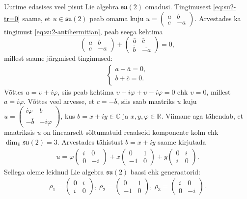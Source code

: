\documentclass[12pt]{article}
\theoremstyle{plain}
\theoremstyle{definition}
\numberwithin{equation}{section}
\def\R{{\mathbb R}}
\def\C{{\mathbb C}}
\def\su2{{\mathfrak{ su}\left(2\right)}}
\begin{document}
Uurime edasises veel pisut Lie algebra $\su2$ omadusi. Tingimusest 
\ref{eq:su2-tr=0} saame, et $u \in \su2$ peab omama kuju 
$u = \begin{pmatrix} a & b \\ c & -a\end{pmatrix}$. Arvestades ka 
tingimust \ref{eq:su2-antihermitian}, peab seega kehtima
\[\begin{pmatrix} a & b \\ c & -a\end{pmatrix} + \begin{pmatrix} 
\overline{a} & \overline{c} \\ \overline{b} & \overline{-a} 
\end{pmatrix} = 0,\]
millest saame järgmised tingimused:
\begin{align*}
\begin{cases}
    a + \overline{a} = 0, \\
    b + \overline{c} = 0. \\
  \end{cases}
\end{align*}
Võttes $a = \upsilon + i\varphi$, siis peab kehtima 
$\upsilon + i\varphi + \upsilon - i\varphi = 0$ ehk $\upsilon = 0$, 
millest $a = i\varphi$. Võttes veel arvesse, et $c = -\overline{b}$, 
siis saab maatriks $u$ kuju $u = \begin{pmatrix} i\varphi & b \\ 
-\overline{b} & -i\varphi \end{pmatrix}$, kus $b=x+iy \in \C$ ja 
$x, y, \varphi \in \R$. Viimane aga tähendab, et maatriksis $u$ 
on lineaarselt sõltumatuid reaalseid komponente kolm ehk 
$\dim_{\R} \su2 = 3$. Arvestades tähistust $b = x + iy$ saame 
kirjutada
\begin{align*}
u = \varphi \begin{pmatrix} i & 0 \\ 0 & -i \end{pmatrix} + 
x \begin{pmatrix} 0 & 1 \\ -1 & 0 \end{pmatrix} + 
y \begin{pmatrix} 0 & i \\ i & 0 \end{pmatrix}.
\end{align*}
Sellega oleme leidnud Lie algebra $\su2$ baasi ehk generaatorid:
\begin{align*}
\rho_1 = \begin{pmatrix} 0 & i \\ i & 0 \end{pmatrix},\ \rho_2 = 
\begin{pmatrix} 0 & 1 \\ -1 & 0 \end{pmatrix},\ \rho_3 = 
\begin{pmatrix} i & 0 \\ 0 & -i \end{pmatrix}.
\end{align*}
\end{document}
